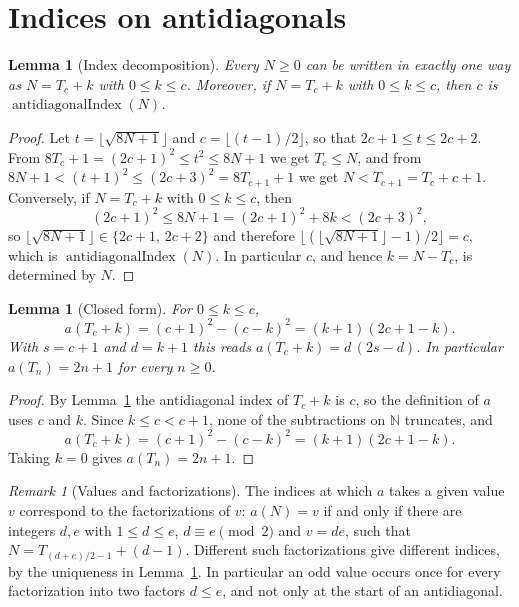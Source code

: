 \documentclass[11pt,a4paper]{article}
\theoremstyle{plain}
\newtheorem{lemma}[theorem]{Lemma}
\theoremstyle{remark}
\newtheorem{remark}[theorem]{Remark}
\begin{document}
\section{Indices on antidiagonals}\label{sec:indices}

\begin{lemma}[Index decomposition]\label{lem:decomp}
Every $N \ge 0$ can be written in exactly one way as $N = T_c + k$ with
$0 \le k \le c$. Moreover, if $N = T_c + k$ with $0 \le k \le c$, then $c$ is
$\operatorname{antidiagonalIndex}(N)$.
\end{lemma}

\begin{proof}
Let $t = \lfloor \sqrt{8N+1} \rfloor$ and $c = \lfloor (t-1)/2 \rfloor$, so that
$2c+1 \le t \le 2c+2$. From $8T_c + 1 = (2c+1)^2 \le t^2 \le 8N+1$ we get
$T_c \le N$, and from $8N+1 < (t+1)^2 \le (2c+3)^2 = 8T_{c+1} + 1$ we get
$N < T_{c+1} = T_c + c + 1$. Conversely, if $N = T_c + k$ with $0 \le k \le c$, then
\[
  (2c+1)^2 \le 8N+1 = (2c+1)^2 + 8k < (2c+3)^2,
\]
so $\lfloor \sqrt{8N+1} \rfloor \in \{2c+1,\, 2c+2\}$ and therefore
$\lfloor (\lfloor \sqrt{8N+1} \rfloor - 1)/2 \rfloor = c$, which is
$\operatorname{antidiagonalIndex}(N)$. In particular $c$, and hence $k = N - T_c$, is
determined by $N$.
\end{proof}

\begin{lemma}[Closed form]\label{lem:closed}
For $0 \le k \le c$,
\[
  a(T_c + k) = (c+1)^2 - (c-k)^2 = (k+1)(2c+1-k).
\]
With $s = c+1$ and $d = k+1$ this reads $a(T_c + k) = d\,(2s-d)$. In particular
$a(T_n) = 2n+1$ for every $n \ge 0$.
\end{lemma}

\begin{proof}
By Lemma~\ref{lem:decomp} the antidiagonal index of $T_c + k$ is $c$, so the
definition of $a$ uses $c$ and $k$. Since $k \le c < c+1$, none of the subtractions on
$\mathbb{N}$ truncates, and
\[
  a(T_c + k) = (c+1)^2 - (c-k)^2 = (k+1)(2c+1-k).
\]
Taking $k = 0$ gives $a(T_n) = 2n+1$.
\end{proof}

\begin{remark}[Values and factorizations]\label{rem:values}
The indices at which $a$ takes a given value $v$ correspond to the factorizations of
$v$: $a(N) = v$ if and only if there are integers $d, e$ with $1 \le d \le e$,
$d \equiv e \pmod 2$ and $v = de$, such that $N = T_{(d+e)/2-1} + (d-1)$. Different
such factorizations give different indices, by the uniqueness in
Lemma~\ref{lem:decomp}. In particular an odd value occurs once for every factorization
into two factors $d \le e$, and not only at the start of an antidiagonal.
\end{remark}
\end{document}
